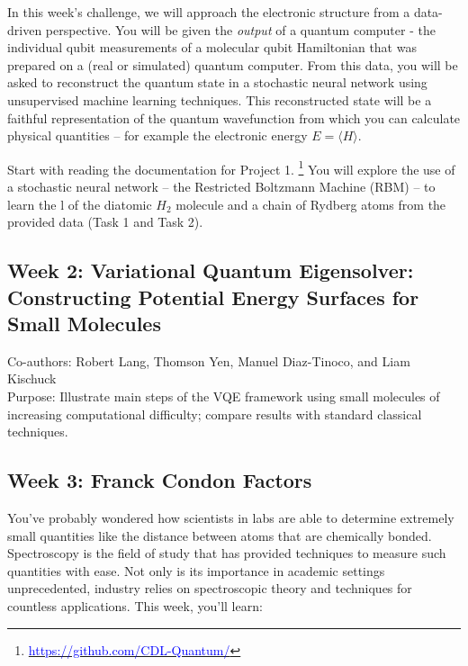\documentclass[12pt]{article}
\begin{document}
In this week's challenge, we will approach the electronic structure from a data-driven perspective.  You will be given the {\it output} of a quantum computer - the individual qubit measurements of a molecular qubit Hamiltonian that was prepared
on a (real or simulated) quantum computer. From this data, you will be asked to reconstruct the quantum state in a stochastic neural network using unsupervised machine learning techniques.  This reconstructed state will be a faithful representation of 
the quantum wavefunction from which you can calculate physical quantities -- for example the electronic energy $E = \langle H \rangle$.

Start with reading the documentation for Project 1.
\footnote{\href{https://github.com/CDL-Quantum/CohortProject_2020/tree/master/Project_1_RBM_and_Tomography}
{\textcolor{blue}{https://github.com/CDL-Quantum/}}}
You will explore the use of a stochastic neural network -- the Restricted Boltzmann Machine (RBM) -- to learn the l of the diatomic $H_2$ molecule 
and a chain of Rydberg atoms from the provided data (Task 1 and Task 2).  


\newpage


\subsection{Week 2: Variational Quantum Eigensolver: Constructing Potential Energy Surfaces for Small Molecules}

Co-authors: Robert Lang, Thomson Yen, Manuel Diaz-Tinoco, and Liam Kischuck
\\
Purpose: Illustrate main steps of the VQE framework using small molecules of increasing computational difficulty; compare results with standard classical techniques.

\newpage

\subsection{Week 3: Franck Condon Factors}

You've probably wondered how scientists in labs are able to determine extremely small quantities like the distance between atoms that are chemically bonded. 
Spectroscopy is the field of study that has provided techniques to measure such quantities with ease. Not only is its importance in academic settings unprecedented, industry relies on spectroscopic theory and techniques for countless applications. This week, you'll learn:
\end{document}
